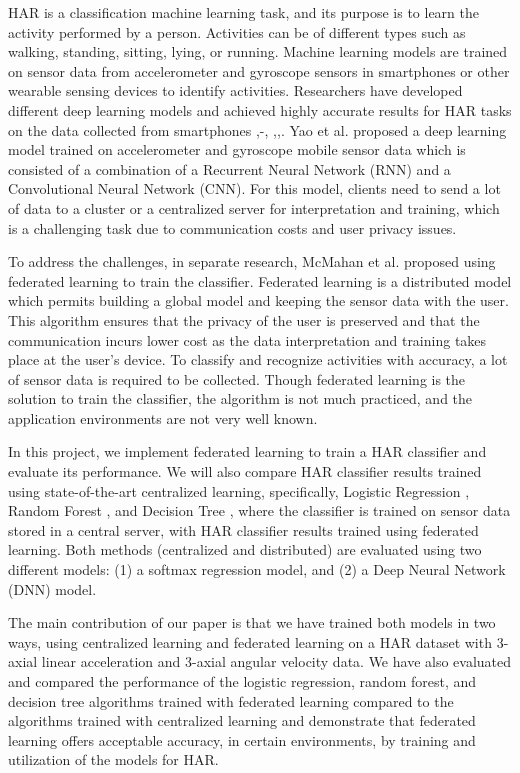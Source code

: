 \documentclass[12pt,conference]{IEEEtran}
\begin{document}
HAR is a classification machine learning task, and its purpose is to learn the activity performed by a person. Activities can be of different types such as walking, standing, sitting, lying, or running. Machine learning models are trained on sensor data from accelerometer and gyroscope sensors in smartphones or other wearable sensing devices to identify activities. Researchers have developed different deep learning models and achieved highly accurate results for HAR tasks on the data collected from smartphones \cite{4Jaouedi2016HumanAR},\cite{6kwapisz2010cell}-\cite{7casale2011human}, \cite{15yao2017deepsense},\cite{16ordonez2016deep},\cite{17hammerla2016deep}. Yao et al.\cite{14aggarwal2011human} proposed a deep learning model trained on accelerometer and gyroscope mobile sensor data which is consisted of a combination of a Recurrent Neural Network (RNN) and a Convolutional Neural Network (CNN). For this model, clients need to send a lot of data to a cluster or a centralized server for interpretation and training, which is a challenging task due to communication costs and user privacy issues.

To address the challenges, in separate research, McMahan et al. \cite{18mcmahan2016federated} proposed using federated learning to train the classifier. Federated learning is a distributed model which permits building a global model and keeping the sensor data with the user. This algorithm ensures that the privacy of the user is preserved and that the communication incurs lower cost as the data interpretation and training takes place at the user’s device. To classify and recognize activities with accuracy, a lot of sensor data is required to be collected. Though federated learning is the solution to train the classifier, the algorithm is not much practiced, and the application environments are not very well known.

In this project, we implement federated learning to train a HAR classifier and evaluate its performance. We will also compare HAR classifier results trained using state-of-the-art centralized learning, specifically, Logistic Regression \cite{19zaki2020logistic}, Random Forest \cite{20feng2015random}, and Decision Tree \cite{21fan2013human}, where the classifier is trained on sensor data stored in a central server, with HAR classifier results trained using federated learning. Both methods (centralized and distributed) are evaluated using two different models: (1) a softmax regression model, and (2) a Deep Neural Network (DNN) model.

The main contribution of our paper is that we have trained both models in two ways, using centralized learning and federated learning on a HAR dataset with 3-axial linear acceleration and 3-axial angular velocity data. We have also evaluated and compared the performance of the logistic regression, random forest, and decision tree algorithms trained with federated learning compared to the algorithms trained with centralized learning and demonstrate that federated learning offers acceptable accuracy, in certain environments, by training and utilization of the models for HAR.
\end{document}

